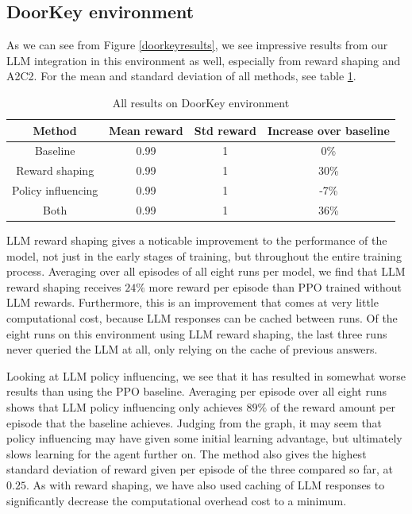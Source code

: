 \documentclass[conference]{IEEEtran}
\begin{document}
\subsection{DoorKey environment}

As we can see from Figure \ref{doorkeyresults}, we see impressive results from our LLM integration in this environment as well, especially from reward shaping and A2C2. For the mean and standard deviation of all methods, see table \ref{doorkeytable}.

\begin{table}[h]
\caption{All results on DoorKey environment}
\begin{center}
\label{doorkeytable}
\begin{tabular}{c | c c c}
Method & Mean reward & Std reward & Increase over baseline \\
\hline
Baseline & 0.99 & 1 & 0\% \\
Reward shaping & 0.99 & 1 & 30\% \\
Policy influencing & 0.99 & 1 & -7\% \\
Both & 0.99 & 1 & 36\% \\
\end{tabular}
\end{center}
\end{table}

LLM reward shaping gives a noticable improvement to the performance of the model, not just in the early stages of training, but throughout the entire training process. Averaging over all episodes of all eight runs per model, we find that LLM reward shaping receives $24\%$ more reward per episode than PPO trained without LLM rewards. Furthermore, this is an improvement that comes at very little computational cost, because LLM responses can be cached between runs. Of the eight runs on this environment using LLM reward shaping, the last three runs never queried the LLM at all, only relying on the cache of previous answers.

Looking at LLM policy influencing, we see that it has resulted in somewhat worse results than using the PPO baseline. Averaging per episode over all eight runs shows that LLM policy influencing only achieves $89\%$ of the reward amount per episode that the baseline achieves. Judging from the graph, it may seem that policy influencing may have given some initial learning advantage, but ultimately slows learning for the agent further on. The method also gives the highest standard deviation of reward given per episode of the three compared so far, at $0.25$. As with reward shaping, we have also used caching of LLM responses to significantly decrease the computational overhead cost to a minimum. 
\end{document}
